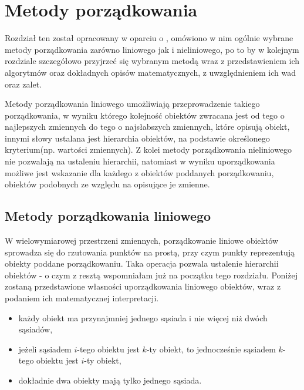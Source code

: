 \documentclass[12pt,a4paper]{report}
\begin{document}
\chapter{Metody porządkowania}\label{metody porzadkowania}
Rozdział ten został opracowany w oparciu o \cite[Rozdział 2]{panek2013}, omówiono w nim ogólnie wybrane metody porządkowania zarówno liniowego jak i nieliniowego, po to by w kolejnym rozdziale szczegółowo przyjrzeć się wybranym metodą wraz z przedstawieniem ich algorytmów oraz dokładnych opisów matematycznych, z uwzględnieniem ich wad oraz zalet.

Metody porządkowania liniowego umożliwiają przeprowadzenie takiego porządkowania, w wyniku którego kolejność obiektów zwracana jest od tego o najlepszych zmiennych do tego o najsłabszych zmiennych, które opisują obiekt, innymi słowy ustalana jest hierarchia obiektów, na podstawie określonego kryterium(np. wartości zmiennych). Z kolei metody porządkowania nieliniowego nie pozwalają na ustaleniu hierarchii, natomiast w wyniku uporządkowania możliwe jest wskazanie dla każdego z obiektów poddanych porządkowaniu, obiektów podobnych ze względu na opisujące je zmienne. 

\section{Metody porządkowania liniowego}

W wielowymiarowej przestrzeni zmiennych, porządkowanie liniowe obiektów sprowadza się do rzutowania punktów na prostą, przy czym punkty reprezentują obiekty poddane porządkowaniu. Taka operacja pozwala ustalenie hierarchii obiektów - o czym z resztą wspomniałam już na początku tego rozdziału.
Poniżej zostaną przedstawione własności uporządkowania liniowego obiektów, wraz z podaniem ich matematycznej interpretacji.

\begin{itemize}
\item każdy obiekt ma przynajmniej jednego sąsiada i nie więcej niż dwóch sąsiadów,
\item jeżeli sąsiadem $i$-tego obiektu jest $k$-ty obiekt, to jednocześnie sąsiadem $k$-tego obiektu jest $i$-ty obiekt,
\item dokładnie dwa obiekty mają tylko jednego sąsiada.
\end{itemize}
\end{document}
